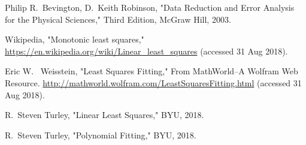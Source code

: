 \documentclass{scrartcl}
\begin{document}
\begin{thebibliography}{9}

Philip R.~Bevington, D.~Keith Robinson, 
"Data Reduction and Error Analysis for the Physical Sciences,"
Third Edition, McGraw Hill, 2003.

Wikipedia, "Monotonic least squares,"
\url{https://en.wikipedia.org/wiki/Linear_least_squares}
(accessed 31 Aug 2018).

Eric W.~ Weisstein, "Least Squares Fitting," From MathWorld--A Wolfram
Web Resource.
\url{http://mathworld.wolfram.com/LeastSquaresFitting.html}
(accessed 31 Aug 2018).

R.~Steven Turley, "Linear Least Squares," BYU, 2018.

R.~Steven Turley, "Polynomial Fitting," BYU, 2018.

\end{thebibliography}
\end{document}
